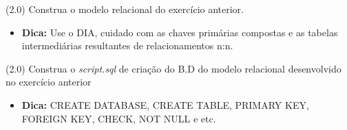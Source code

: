 \documentclass[12pt]{exam}
\begin{document}
\begin{questions}


\question (2.0) Construa o modelo relacional do exercício anterior.

\begin{itemize}
    \item \textbf{Dica:} Use o DIA, cuidado com as chaves primárias compostas e as tabelas intermediárias resultantes de relacionamentos n:n.
\end{itemize}


\question (2.0) Construa o \textit{script.sql} de criação do B.D do modelo relacional desenvolvido no exercício anterior 
\begin{itemize}
    \item \textbf{Dica:} CREATE DATABASE, CREATE TABLE, PRIMARY KEY, FOREIGN KEY, CHECK, NOT NULL e etc.
\end{itemize}










\end{questions}
\end{document}

